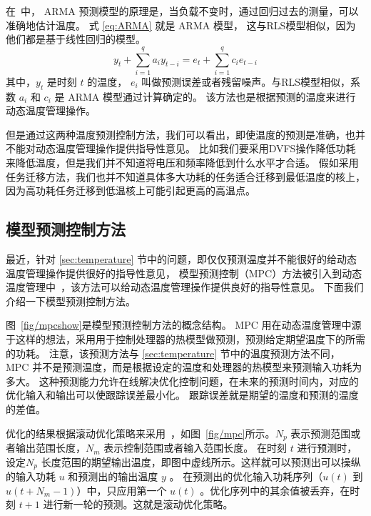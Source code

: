在~\cite{coskun2008proactive}中，  ARMA 预测模型的原理是，当负载不变时，通过回归过去的测量，可以准确地估计温度。
式  \eqref{eq:ARMA} 就是 ARMA 模型， 这与RLS模型相似，因为他们都是基于线性回归的模型。
\begin{equation}\label{eq:ARMA}
y_t + \sum_{i=1}^qa_iy_{t-i} = e_t +\sum_{i=1}^qc_ie_{t-i}
\end{equation}
其中，$y_t$ 是时刻 $t$ 的温度， $e_i$ 叫做预测误差或者残留噪声。与RLS模型相似，系数 $a_i$ 和 $c_i$ 是 ARMA 模型通过计算确定的。
该方法也是根据预测的温度来进行动态温度管理操作。

但是通过这两种温度预测控制方法，我们可以看出，即使温度的预测是准确，也并不能对动态温度管理操作提供指导性意见。
比如我们要采用DVFS操作降低功耗来降低温度，但是我们并不知道将电压和频率降低到什么水平才合适。 
假如采用任务迁移方法，我们也并不知道具体多大功耗的任务适合迁移到最低温度的核上，因为高功耗任务迁移到低温核上可能引起更高的高温点。

\subsection{模型预测控制方法}\label{sec:mpc}

最近，针对 \ref{sec:temperature} 节中的问题，即仅仅预测温度并不能很好的给动态温度管理操作提供很好的指导性意见，
模型预测控制（MPC）方法被引入到动态温度管理中~\cite{Zanini:ECCTD'09}，该方法可以给动态温度管理操作提供良好的指导性意见。
下面我们介绍一下模型预测控制方法。

图~\ref{fig/mpcshow}是模型预测控制方法的概念结构。 MPC 用在动态温度管理中源于这样的想法，采用用于控制处理器的热模型做预测，预测给定期望温度下的所需的功耗。
注意，该预测方法与 \ref{sec:temperature} 节中的温度预测方法不同， MPC 并不是预测温度，而是根据设定的温度和处理器的热模型来预测输入功耗为多大。
这种预测能力允许在线解决优化控制问题，在未来的预测时间内，对应的优化输入和输出可以使跟踪误差最小化。 跟踪误差就是期望的温度和预测的温度的差值。

优化的结果根据滚动优化策略来采用~\cite{bemporad1999robust}，如图~\ref{fig/mpc}所示。$N_p$ 表示预测范围或者输出范围长度，$N_m$ 表示控制范围或者输入范围长度。
在时刻 $t$ 进行预测时，设定$N_p$ 长度范围的期望输出温度，即图中虚线所示。这样就可以预测出可以操纵的输入功耗 $u$ 和预测出的输出温度 $y$ 。
在预测出的优化输入功耗序列（$ u(t) $ 到 $ u(t+N_m-1) $）中，只应用第一个 $ u(t)$ 。优化序列中的其余值被丢弃，在时刻 $t+1$ 进行新一轮的预测。这就是滚动优化策略。 



